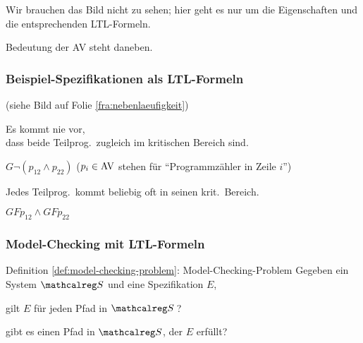 \begin{frame}
{        \parII
        Wir brauchen das Bild nicht zu sehen; hier geht es nur um die Eigenschaften
        und die entsprechenden LTL-Formeln.
        
        \parI
        Bedeutung der AV steht daneben.
        
        \par
      }
    \end{frame}

    \begin{frame}
      \frametitle{Beispiel-Spezifikationen als LTL-Formeln}

         {\footnotesize (siehe Bild auf Folie \ref{fra:nebenlaeufigkeit})}
        \begin{Itemize}
          \item%
            Es kommt nie vor,\\
            dass beide Teilprog.\ zugleich im kritischen Bereich sind.
            \par\smallskip
            $G\neg (p_{12} \land p_{22})$ \hfill {\footnotesize ($p_i \in \textup{AV}$ stehen für "`Programmzähler in Zeile $i$"')}
            \par\smallskip
          \item<2->%
            Jedes Teilprog.\ kommt beliebig oft in seinen krit.\ Bereich.
            \par\smallskip
            $GF p_{12} \land GF p_{22}$
        \end{Itemize}

    \end{frame}

    \begin{frame}
      \frametitle{Model-Checking mit LTL-Formeln}

      \begin{block}{Definition \ref{def:model-checking-problem}: Model-Checking-Problem }
        Gegeben ein System $\calS$ und eine Spezifikation $E$,
        \begin{Itemize}
          \item
            gilt $E$ für jeden Pfad in $\calS$\,?\\
          \item
            gibt es einen Pfad in $\calS$, der $E$ erfüllt?\\
        \end{Itemize}
      \end{block}

    \end{frame}

